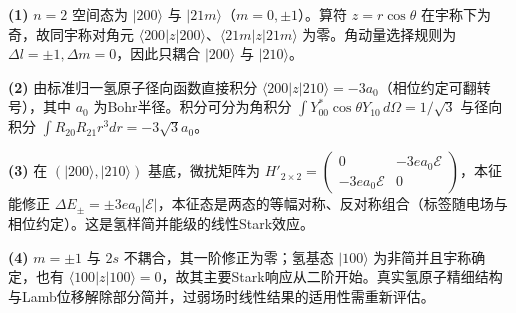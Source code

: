 \par\noindent\textbf{(1)} \(n=2\) 空间态为 \(|200\rangle\) 与 \(|21m\rangle\)（\(m=0,\pm1\)）。算符 \(z=r\cos\theta\) 在宇称下为奇，故同宇称对角元 \(\langle 200|z|200\rangle\)、\(\langle21m|z|21m\rangle\) 为零。角动量选择规则为 \(\Delta l=\pm1,\Delta m=0\)，因此只耦合 \(|200\rangle\) 与 \(|210\rangle\)。
\par\noindent\textbf{(2)} 由标准归一氢原子径向函数直接积分 \( \langle 200|z|210\rangle=-3a_0\)（相位约定可翻转号），其中 \(a_0\) 为Bohr半径。积分可分为角积分 \(\int Y_{00}^*\cos\theta Y_{10}\,d\Omega=1/\sqrt3\) 与径向积分 \(\int R_{20}R_{21}r^3dr=-3\sqrt3a_0\)。
\par\noindent\textbf{(3)} 在 \((|200\rangle,|210\rangle)\) 基底，微扰矩阵为 \(H'_{2\times2}=\begin{pmatrix}0&-3ea_0\mathcal E\\-3ea_0\mathcal E&0\end{pmatrix}\)，本征能修正 \(\Delta E_\pm=\pm3ea_0|\mathcal E|\)，本征态是两态的等幅对称、反对称组合（标签随电场与相位约定）。这是氢样简并能级的线性Stark效应。
\par\noindent\textbf{(4)} \(m=\pm1\) 与 \(2s\) 不耦合，其一阶修正为零；氢基态 \(|100\rangle\) 为非简并且宇称确定，也有 \(\langle100|z|100\rangle=0\)，故其主要Stark响应从二阶开始。真实氢原子精细结构与Lamb位移解除部分简并，过弱场时线性结果的适用性需重新评估。
